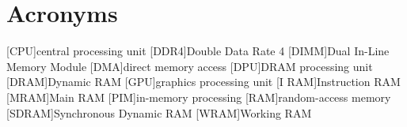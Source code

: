 \section{Acronyms}

\begin{acronym}
	[CPU]{central processing unit}
	[DDR4]{Double Data Rate 4}
	[DIMM]{Dual In-Line Memory Module}
	[DMA]{direct memory access}
	[DPU]{\acs*{DRAM} processing unit}
	[DRAM]{Dynamic \acs*{RAM}}
	[GPU]{graphics processing unit}
	[I\kern1pt RAM]{Instruction \acs*{RAM}}
	[MRAM]{Main \acs*{RAM}}
	[PIM]{in-memory processing}
	[RAM]{random-access memory}
	[SDRAM]{Synchronous Dynamic \acs*{RAM}}
	[WRAM]{Working \acs*{RAM}}
\end{acronym}
